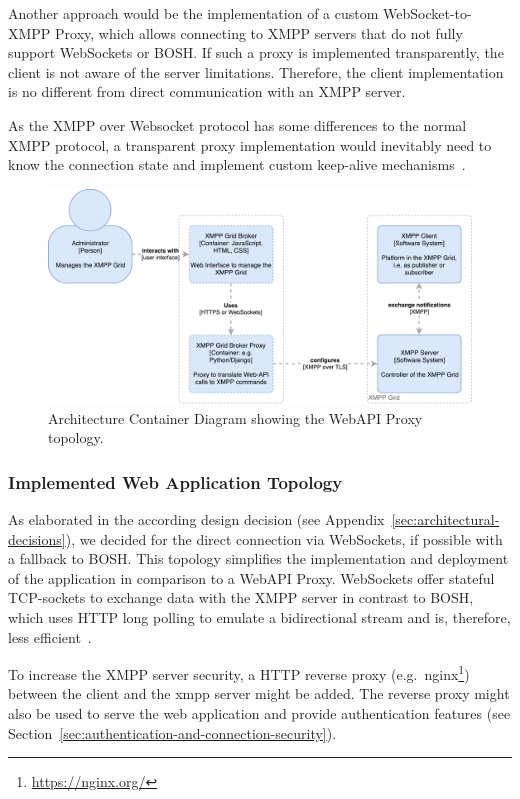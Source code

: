 Another approach would be the implementation of a custom WebSocket-to-XMPP Proxy, which allows connecting to XMPP servers that do not fully support WebSockets or BOSH.
If such a proxy is implemented transparently, the client is not aware of the server limitations.
Therefore, the client implementation is no different from direct communication with an XMPP server.

As the XMPP over Websocket protocol has some differences to the normal XMPP protocol, a transparent proxy implementation would inevitably need to know the connection state and implement custom keep-alive mechanisms~\cite{rfc7395}.

\begin{figure}[h]
\centering
\includegraphics[width=\linewidth]{resources/architecture_container_proxy.pdf}
\caption[Architecture Container Diagram: Web Proxy]{Architecture Container Diagram showing the WebAPI Proxy topology.}
\label{fig:architecturecontainerwebproxy}
\end{figure}

\subsubsection{Implemented Web Application Topology}\label{sec:implemented-web-application-topology}

As elaborated in the according design decision (see Appendix~\ref{sec:architectural-decisions}), we decided for the direct connection via WebSockets, if possible with a fallback to BOSH.
This topology simplifies the implementation and deployment of the application in comparison to a WebAPI Proxy.
WebSockets offer stateful TCP-sockets to exchange data with the XMPP server in contrast to BOSH, which uses HTTP long polling to emulate a bidirectional stream and is, therefore, less efficient~\cite{xep-0124}.

To increase the XMPP server security, a HTTP reverse proxy (e.g.\ nginx\footnote{\url{https://nginx.org/}}) between the client and the xmpp server might be added. The reverse proxy might also be used to serve the web application and provide authentication features (see Section~\ref{sec:authentication-and-connection-security}).


